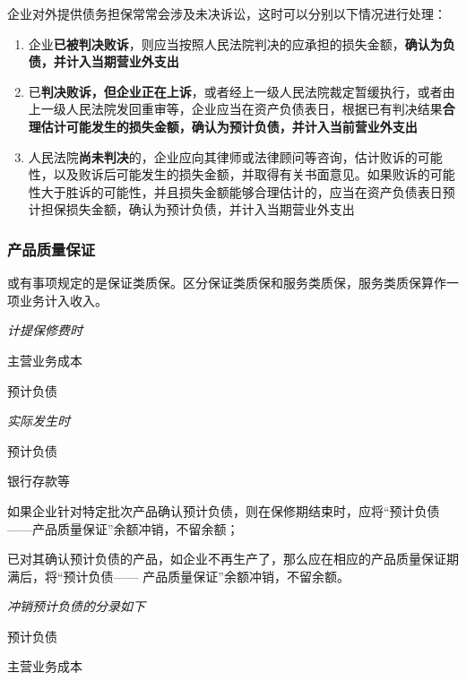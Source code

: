 \documentclass[UTF8,12pt]{ctexart}
\newenvironment{Dr}{%
	\begin{list}{}%
		{
			\setlength{\leftmargin}{2em}
			\setlength{\labelwidth}{2em}
			\setlength{\labelsep}{0pt}
			\setlength{\itemindent}{0pt}
			\setlength{\listparindent}{0pt}
			\setlength{\parsep}{0pt}
			\setlength{\topsep}{0pt}
		}
		\item[\textbf{借：}]
	}{%
	\end{list}
}
\newenvironment{Cr}{%
	\begin{list}{}%
		{
			\setlength{\leftmargin}{3em}
			\setlength{\labelwidth}{2em}
			\setlength{\labelsep}{0pt}
			\setlength{\itemindent}{0pt}
			\setlength{\listparindent}{0pt}
			\setlength{\parsep}{0pt}
			\setlength{\topsep}{0pt}
		}
		\item[\textbf{贷：}]
	}{%
	\end{list}
}
\numberwithin{equation}{section} %
\numberwithin{figure}{section}
\numberwithin{table}{section}
\begin{document}
	企业对外提供债务担保常常会涉及未决诉讼，这时可以分别以下情况进行处理：
	\begin{enumerate}
		\item 企业\textbf{已被判决败诉}，则应当按照人民法院判决的应承担的损失金额，\textbf{确认为负债，并计入当期营业外支出}
		
		\item 已\textbf{判决败诉，但企业正在上诉}，或者经上一级人民法院裁定暂缓执行，或者由上一级人民法院发回重审等，企业应当在资产负债表日，根据已有判决结果\textbf{合理估计可能发生的损失金额，确认为预计负债，并计入当前营业外支出}

		\item 人民法院\textbf{尚未判决}的，企业应向其律师或法律顾问等咨询，估计败诉的可能性，以及败诉后可能发生的损失金额，并取得有关书面意见。如果败诉的可能性大于胜诉的可能性，并且损失金额能够合理估计的，应当在资产负债表日预计担保损失金额，确认为预计负债，并计入当期营业外支出
	\end{enumerate}
	
	
	\subsubsection{产品质量保证}

	或有事项规定的是保证类质保。区分保证类质保和服务类质保，服务类质保算作一项业务计入收入。
	
	\textit{计提保修费时}
	
	\begin{Dr}
		主营业务成本
	\end{Dr}
	\begin{Cr}
		预计负债
	\end{Cr}
	
	\textit{实际发生时}
	
	\begin{Dr}
		预计负债
	\end{Dr}
	\begin{Cr}
		银行存款等
	\end{Cr}
	
	如果企业针对特定批次产品确认预计负债，则在保修期结束时，应将“预计负债——产品质量保证”余额冲销，不留余额；
	
	已对其确认预计负债的产品，如企业不再生产了，那么应在相应的产品质量保证期满后，将“预计负债—— 产品质量保证”余额冲销，不留余额。
	
	\textit{冲销预计负债的分录如下}
	
	\begin{Dr}
		预计负债
	\end{Dr}
	\begin{Cr}
		主营业务成本
	\end{Cr}
\end{document}
